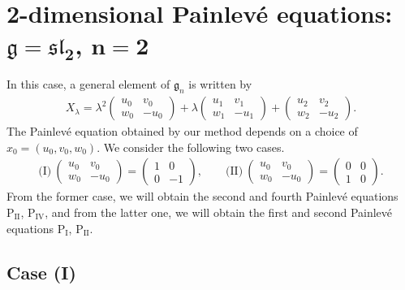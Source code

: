 \documentclass[10pt,a4paper]{amsart}
\numberwithin{equation}{section}
\begin{document}
\section[2-dimensional Painlev\'{e} equations: $\mathfrak{g} = \mathfrak{sl}_2$, $n=2$]{2-dimensional Painlev\'{e} equations: $\boldsymbol{\mathfrak{g} = \mathfrak{sl}_2}$, $\boldsymbol{n=2}$}\label{section3}

In this case, a general element of $\mathfrak{g}_n$ is written by
\begin{gather*}
X_\lambda = \lambda ^2 \left(
\begin{matrix}
u_0 & v_0 \\
w_0 & -u_0
\end{matrix}
\right) + \lambda \left(
\begin{matrix}
u_1 & v_1 \\
w_1 & -u_1
\end{matrix}
\right) + \left(
\begin{matrix}
u_2 & v_2 \\
w_2 & -u_2
\end{matrix}
\right).
\end{gather*}
The Painlev\'{e} equation obtained by our method depends on a choice of $x_0 = (u_0, v_0, w_0)$. We consider the following two cases.
\begin{gather*}
\text{(I)}\ \left(
\begin{matrix}
u_0 & v_0 \\
w_0 & -u_0
\end{matrix}
\right) = \left(
\begin{matrix}
1 & 0 \\
0 & -1
\end{matrix}
\right), \qquad \text{(II)}\ \left(
\begin{matrix}
u_0 & v_0 \\
w_0 & -u_0
\end{matrix}
\right) = \left(
\begin{matrix}
0 & 0 \\
1 & 0
\end{matrix}
\right).
\end{gather*}
From the former case, we will obtain the second and fourth Painlev\'{e} equations $\text{P}_\text{II}$, $\text{P}_\text{IV}$, and from the latter one, we will obtain the f\/irst and second Painlev\'{e} equations $\text{P}_\text{I}$, $\text{P}_\text{II}$.

\subsection{Case (I)}\label{section3.1}
\end{document}

